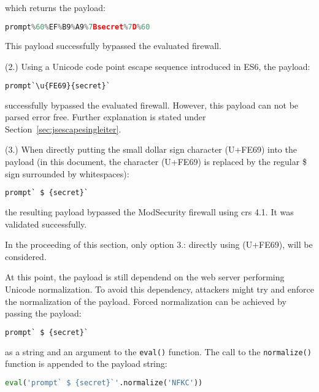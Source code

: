 which returns the payload:

\begin{lstlisting}[style=basicStyle, language=Python]
prompt%60%EF%B9%A9%7Bsecret%7D%60
\end{lstlisting}

This payload successfully bypassed the evaluated firewall.

(2.) Using a Unicode code point escape sequence introduced in ES6, the payload:

\begin{lstlisting}[style=basicStyle, language=Python]
prompt`\u{FE69}{secret}`
\end{lstlisting}

successfully bypassed the evaluated firewall. However, this payload can not be parsed error free. Further explanation is stated under Section~\ref{sec:jsescapesingleiter}.

(3.) When directly putting the small dollar sign character (U+FE69) into the payload (in this document, the character (U+FE69) is replaced by the regular \$ sign surrounded by whitespaces):

\begin{lstlisting}[style=basicStyle, language=Python]
prompt` $ {secret}`
\end{lstlisting}

the resulting payload bypassed the ModSecurity firewall using \acrshort{crs} 4.1. It was validated successfully.

In the proceeding of this section, only option 3.: directly using (U+FE69), will be considered. 

At this point, the payload is still dependend on the web server performing Unicode normalization. To avoid this dependency, attackers might try and enforce the normalization of the payload. Forced normalization can be achieved by passing the payload:

\begin{lstlisting}[style=basicStyle, language=Python]
prompt` $ {secret}`
\end{lstlisting}

as a string and an argument to the \verb|eval()| function. The call to the \verb|normalize()| function is appended to the payload string:

\begin{lstlisting}[style=basicStyle, language=Python]
eval('prompt` $ {secret}`'.normalize('NFKC'))
\end{lstlisting}

